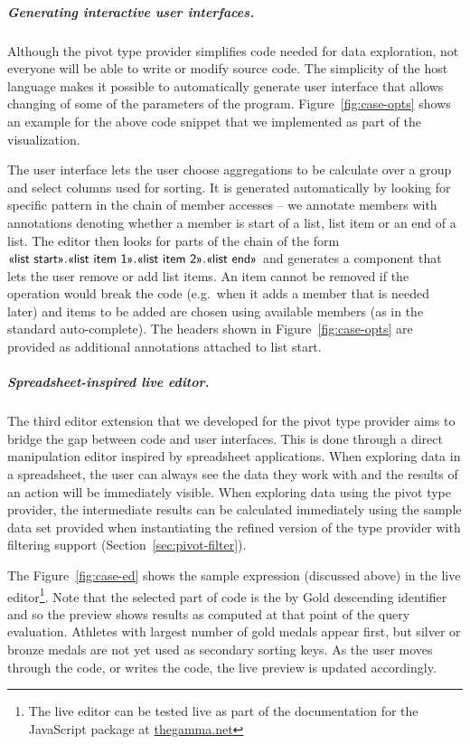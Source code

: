 \documentclass[a4paper,UKenglish]{lipics-v2016}
\theoremstyle{plain}
\theoremstyle{definition}
\newcommand{\qident}[1]{\textnormal{\sffamily \guillemotleft #1\guillemotright}}
\begin{document}

\subparagraph{Generating interactive user interfaces.}
Although the pivot type provider simplifies code needed for data exploration, not everyone will 
be able to write or modify source code. The simplicity of the host language makes it possible to  
automatically generate user interface that allows changing of some of the parameters of the program. 
Figure~\ref{fig:case-opts} shows an example for the above code snippet that we implemented as 
part of the visualization. 

The user interface lets the user choose aggregations to be calculate over a group and select 
columns used for sorting. It is generated automatically by looking for specific pattern in the 
chain of member accesses -- we annotate members with annotations denoting whether a member is 
start of a list, list item or an end of a list. The editor then looks for parts of the chain of the
form $\qident{list start}.\qident{list item 1}.\qident{list item 2}.\qident{list end}$ and generates
a component that lets the user remove or add list items. An item cannot be removed if the operation
would break the code (e.g.~when it adds a member that is needed later) and items to be added
are chosen using available members (as in the standard auto-complete). The headers
shown in Figure~\ref{fig:case-opts} are provided as additional annotations attached to 
\qident{list start}.


\subparagraph{Spreadsheet-inspired live editor.}
The third editor extension that we developed for the pivot type provider aims to bridge the gap 
between code and user interfaces. This is done through a direct manipulation editor \cite{directman} 
inspired by spreadsheet applications. When exploring data in a spreadsheet, the user can always see the 
data they work with and the results of an action will be immediately visible. When exploring data
using the pivot type provider, the intermediate results can be calculated immediately using the 
sample data set provided when instantiating the refined version of the type provider with filtering
support (Section~\ref{sec:pivot-filter}). 

The Figure~\ref{fig:case-ed} shows the sample expression (discussed above) in the live 
editor\footnote{The live editor can be tested live as part of the documentation for the 
JavaScript package at \url{thegamma.net}}.
Note that the selected part of code is the \qident{by Gold descending} identifier and so the 
preview shows results as computed at that point of the query evaluation. Athletes with largest number
of gold medals appear first, but silver or bronze medals are not yet used as secondary sorting keys.
As the user moves through the code, or writes the code, the live preview is updated accordingly.
\end{document}

